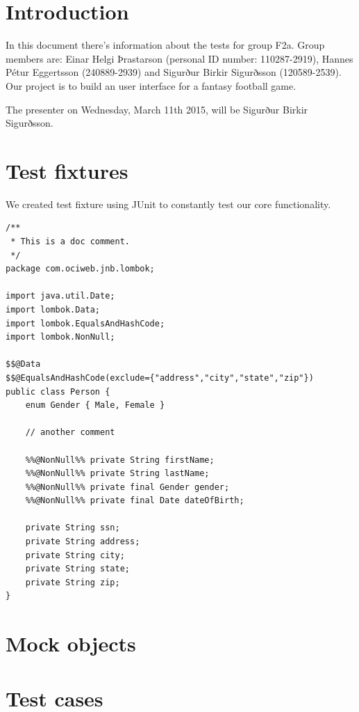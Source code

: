 \documentclass{article}
\begin{document}
\section{Introduction}
In this document there's information about the tests for group F2a. Group members are: Einar Helgi Þrastarson (personal ID number: 110287-2919), Hannes Pétur Eggertsson (240889-2939) and Sigurður Birkir Sigurðsson (120589-2539). Our project is to build an user interface for a fantasy football game.

The presenter on Wednesday, March 11th 2015, will be Sigurður Birkir Sigurðsson.

\section{Test fixtures}
We created test fixture using JUnit to constantly test our core functionality.

\begin{lstlisting}
/**
 * This is a doc comment.
 */
package com.ociweb.jnb.lombok;

import java.util.Date;
import lombok.Data;
import lombok.EqualsAndHashCode;
import lombok.NonNull;

$$@Data
$$@EqualsAndHashCode(exclude={"address","city","state","zip"})
public class Person {
    enum Gender { Male, Female }

    // another comment

    %%@NonNull%% private String firstName;
    %%@NonNull%% private String lastName;
    %%@NonNull%% private final Gender gender;
    %%@NonNull%% private final Date dateOfBirth;

    private String ssn;
    private String address;
    private String city;
    private String state;
    private String zip;
}
\end{lstlisting}

\section{Mock objects}

\section{Test cases}
\end{document}

